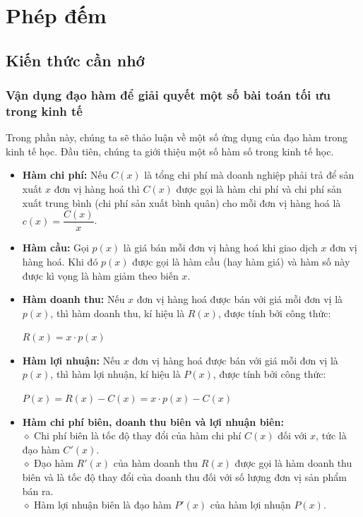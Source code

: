 
\section{Phép đếm}
\subsection{Kiến thức cần nhớ}
\begin{khung}
	\subsubsection{Vận dụng đạo hàm để giải quyết một số bài toán tối ưu trong kinh tế} Trong phần này, chúng ta sẽ thảo luận về một số ứng dụng của đạo hàm trong kinh tế học. Đầu tiên, chúng ta giới thiệu một số hàm số trong kinh tế học.
	\begin{itemize}
		\item \textbf{Hàm chi phí:} Nếu $C(x)$ là tổng chi phí mà doanh nghiệp phải trả để sản xuất $x$ đơn vị hàng hoá thì $C(x)$ được gọi là hàm chi phí và chi phí sản xuất trung bình (chi phí sản xuất bình quân) cho mỗi đơn vị hàng hoá là $c(x) = \dfrac{C(x)}{x}$.
	\end{itemize}
	\begin{itemize}
		\item \textbf{Hàm cầu:} Gọi $p(x)$ là giá bán mỗi đơn vị hàng hoá khi giao dịch $x$ đơn vị hàng hoá. Khi đó $p(x)$ được gọi là hàm cầu (hay hàm giá) và hàm số này được kì vọng là hàm giảm theo biến $x$.
	\end{itemize}
	\begin{itemize}
		\item \textbf{Hàm doanh thu:} Nếu $x$ đơn vị hàng hoá được bán với giá mỗi đơn vị là $p(x)$, thì hàm doanh thu, kí hiệu là $R(x)$, được tính bởi công thức:
		\begin{center}
					$R(x) = x \cdot p(x)$
		\end{center}
	\end{itemize}
	\begin{itemize}
		\item \textbf{Hàm lợi nhuận:} Nếu $x$ đơn vị hàng hoá được bán với giá mỗi đơn vị là $p(x)$, thì hàm lợi nhuận, kí hiệu là $P(x)$, được tính bởi công thức:
		\begin{center}
			$P(x) = R(x) - C(x) = x \cdot p(x) - C(x)$
		\end{center}
	\end{itemize}
	\begin{itemize}
		\item \textbf{Hàm chi phí biên, doanh thu biên và lợi nhuận biên:}\\
		$\diamond$ Chi phí biên là tốc độ thay đổi của hàm chi phí $C(x)$ đối với $x$, tức là đạo hàm $C'(x)$.\\
		$\diamond$ Đạo hàm $R'(x)$ của hàm doanh thu $R(x)$ được gọi là hàm doanh thu biên và là tốc độ thay đổi của doanh thu đối với số lượng đơn vị sản phẩm bán ra.\\
		$\diamond$ Hàm lợi nhuận biên là đạo hàm $P'(x)$ của hàm lợi nhuận $P(x)$.\\
	\end{itemize}


\end{khung}
